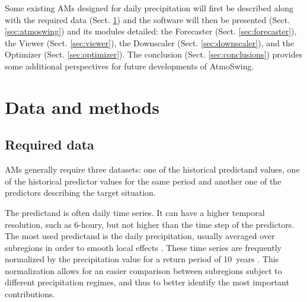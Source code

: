 \documentclass[review]{elsarticle}
\begin{document}
Some existing AMs designed for daily precipitation will first be described along with the required data (Sect. \ref{sec:data_methods}) and the software will then be presented (Sect. \ref{sec:atmoswing}) and its modules detailed: the Forecaster (Sect. \ref{sec:forecaster}), the Viewer (Sect. \ref{sec:viewer}), the Downscaler (Sect. \ref{sec:downscaler}), and the Optimizer (Sect. \ref{sec:optimizer}). The conclusion (Sect. \ref{sec:conclusions}) provides some additional perspectives for future developments of AtmoSwing. 


\section{Data and methods}
\label{sec:data_methods}


\subsection{Required data}
\label{sec:data}

AMs generally require three datasets: one of the historical predictand values, one of the historical predictor values for the same period and another one of the predictors describing the target situation.

The predictand is often daily time series. It can have a higher temporal resolution, such as 6-houry, but not higher than the time step of the predictors. The most used predictand is the daily precipitation, usually averaged over subregions in order to smooth local effects \citep{Obled2002, Marty2012}. These time series are frequently normalized by the precipitation value for a return period of 10~years \citep{Djerboua2001}. This normalization allows for an easier comparison between subregions subject to different precipitation regimes, and thus to better identify the most important contributions.
\end{document}

